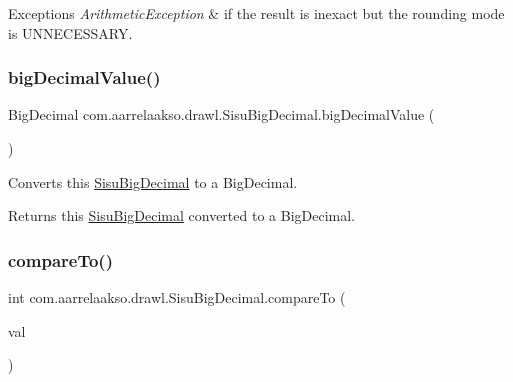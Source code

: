 \begin{DoxyExceptions}{Exceptions}
{\em Arithmetic\+Exception} & if the result is inexact but the rounding mode is U\+N\+N\+E\+C\+E\+S\+S\+A\+RY. \\
\hline
\end{DoxyExceptions}
\mbox{\label{classcom_1_1aarrelaakso_1_1drawl_1_1_sisu_big_decimal_a48686473be6df9038c67d2cefa26c311}} 
\subsubsection{\texorpdfstring{big\+Decimal\+Value()}{bigDecimalValue()}}
{\footnotesize\ttfamily Big\+Decimal com.\+aarrelaakso.\+drawl.\+Sisu\+Big\+Decimal.\+big\+Decimal\+Value (\begin{DoxyParamCaption}{ }\end{DoxyParamCaption})\hspace{0.3cm}{\ttfamily [protected]}}



Converts this \hyperlink{classcom_1_1aarrelaakso_1_1drawl_1_1_sisu_big_decimal}{Sisu\+Big\+Decimal} to a Big\+Decimal. 

\begin{DoxyReturn}{Returns}
this \hyperlink{classcom_1_1aarrelaakso_1_1drawl_1_1_sisu_big_decimal}{Sisu\+Big\+Decimal} converted to a Big\+Decimal. 
\end{DoxyReturn}
\mbox{\label{classcom_1_1aarrelaakso_1_1drawl_1_1_sisu_big_decimal_a450f5da2c47612d8af98e59958ebccc6}} 
\subsubsection{\texorpdfstring{compare\+To()}{compareTo()}}
{\footnotesize\ttfamily int com.\+aarrelaakso.\+drawl.\+Sisu\+Big\+Decimal.\+compare\+To (\begin{DoxyParamCaption}\item[{\hyperlink{classcom_1_1aarrelaakso_1_1drawl_1_1_sisu_big_decimal}{Sisu\+Big\+Decimal}}]{val }\end{DoxyParamCaption})}



